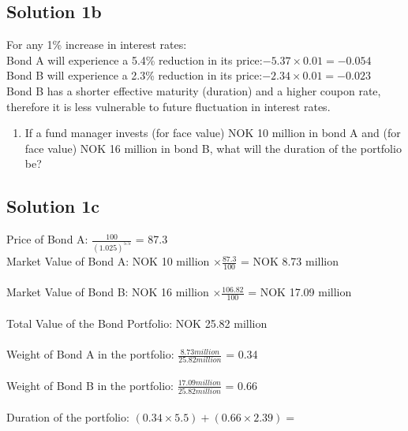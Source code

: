 \documentclass[12]{article}
\begin{document}
\color{blue}
\subsection*{Solution 1b}
For any 1\% increase in interest rates:\\
Bond A will experience a 5.4\% reduction in its price:$-5.37 \times 0.01 =  -0.054$\\
Bond B will experience a 2.3\% reduction in its price:$-2.34 \times 0.01 =  -0.023$\\
Bond B has a shorter effective maturity (duration) and a higher coupon rate, therefore it is less vulnerable to future fluctuation in interest rates.







\color{black}
\begin{enumerate}
    \item[c)] If a fund manager invests (for face value) NOK 10 million in bond A and (for face value) NOK 16 million in bond B, what will the duration of the portfolio be?
\end{enumerate}

\color{blue}
\subsection*{Solution 1c}
Price of Bond A: {\Large $\frac{100}{(1.025)^{5.5}}$} = 87.3\\
Market Value of Bond A: NOK 10 million {\Large$ \times \frac{87.3}{100} $} =  NOK 8.73 million\\
\\
Market Value of Bond B: NOK 16 million {\Large$ \times \frac{106.82}{100}$} = NOK 17.09 million\\
\\
Total Value of the Bond Portfolio: NOK 25.82 million\\
\\
Weight of Bond A in the portfolio: {\Large $\frac{8.73 million }{25.82 million}$} = 0.34\\
\\
Weight of Bond B in the portfolio: {\Large $\frac{17.09 million }{25.82 million}$} = 0.66\\
\\
Duration of the portfolio: $(0.34 \times 5.5) + (0.66 \times 2.39) = $ 



{\Large}
\end{document}
